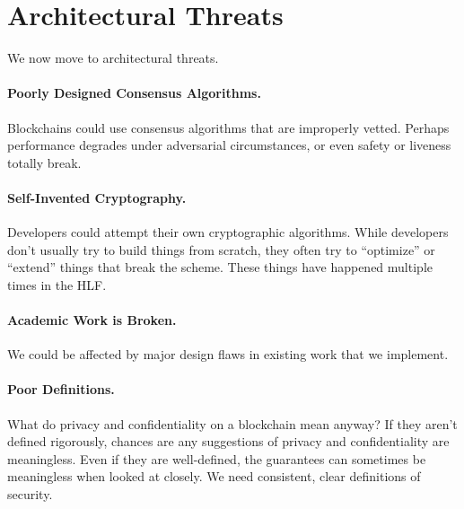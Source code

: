 
\section{Architectural Threats}
We now move to architectural threats.

\paragraph{Poorly Designed Consensus Algorithms.}  Blockchains could use consensus algorithms that are improperly vetted.  Perhaps performance degrades under adversarial circumstances, or even safety or liveness totally break.

\paragraph{Self-Invented Cryptography.}  Developers could attempt their own cryptographic algorithms.  While developers don't usually try to build things from scratch, they often try to ``optimize'' or ``extend'' things that break the scheme.  These things have happened multiple times in the HLF.

\paragraph{Academic Work is Broken.}  We could be affected by major design flaws in existing work that we implement.  

\paragraph{Poor Definitions.}  What do privacy and confidentiality on a blockchain mean anyway?  If they aren't defined rigorously, chances are any suggestions of privacy and confidentiality are meaningless.  Even if they are well-defined, the guarantees can sometimes be meaningless when looked at closely.  We need consistent, clear definitions of security.
